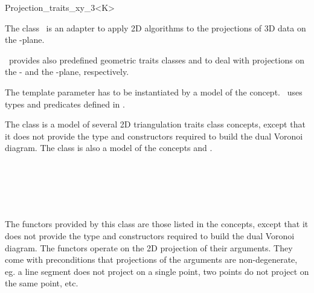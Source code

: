 
\begin{ccRefClass}{Projection_traits_xy_3<K>}  %

\ccDefinition
  
The class \ccRefName\ is an adapter to apply 2D algorithms to the projections of 3D data on the -plane.


\cgal\ provides also predefined geometric traits classes
 and
 to
deal with projections on the
 - and  the -plane,
respectively.  

\ccParameters
The template parameter   has to
be instantiated by a model of the  concept.
\ccRefName\ uses types 
and predicates defined in .


\ccIsModel

The class is a model of several 2D triangulation traits class concepts,
except that it does not provide the type and constructors
required to build the dual Voronoi diagram. The class is also a model
of the concepts  and .

 \\
 \\
 \\
 \\

\ccTypes

\ccGlue
{}
\ccGlue
{}
\ccGlue
{}



The functors provided by this class are those listed in the concepts,
except that it does not provide the type and constructors
required to build the dual Voronoi diagram.
The functors operate on the 2D projection of their arguments. They come with preconditions that projections of the arguments are non-degenerate, eg. a line segment does not project on a single point, two points do not project on the same point, etc.


\end{ccRefClass}
